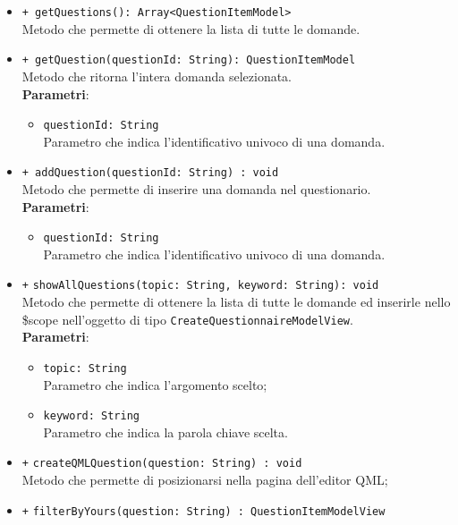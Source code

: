\begin{itemize}
\begin{itemize}
			\item \texttt{+ getQuestions(): Array<QuestionItemModel>} \\
			Metodo che permette di ottenere la lista di tutte le domande.
			
			\item \texttt{+ getQuestion(questionId: String): QuestionItemModel} \\
			Metodo che ritorna l'intera domanda selezionata. \\
			\textbf{Parametri}:
			\begin{itemize}
				\item \texttt{questionId: String}\\
				Parametro che indica l'identificativo univoco di una domanda.
			\end{itemize}
			\item \texttt{+ addQuestion(questionId: String) : void} \\
			Metodo che permette di inserire una domanda nel questionario. \\
			\textbf{Parametri}:
			\begin{itemize}
				\item \texttt{questionId: String}\\
				Parametro che indica l'identificativo univoco di una domanda.
			\end{itemize}
			\item \texttt{+} \texttt{showAllQuestions(topic: String, keyword: String): void} \\
			Metodo che permette di ottenere la lista di tutte le domande ed inserirle nello \$scope nell'oggetto di tipo \texttt{CreateQuestionnaireModelView}.\\
			\textbf{Parametri}:
			\begin{itemize}
				\item \texttt{topic: String}\\ Parametro che indica l'argomento scelto;
				\item \texttt{keyword: String}\\ Parametro che indica la parola chiave scelta.
			\end{itemize}
			\item \texttt{+} \texttt{createQMLQuestion(question: String) : void} \\
			Metodo che permette di posizionarsi nella pagina dell'editor QML;\\
			\item \texttt{+} \texttt{filterByYours(question: String) : QuestionItemModelView} \\

\end{itemize}
\end{itemize}
